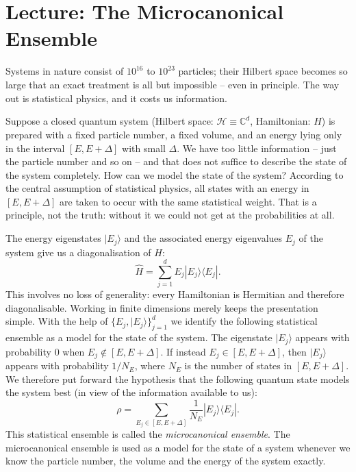 
\section{Lecture: The Microcanonical Ensemble}
Systems in nature consist of $10^{16}$ to $10^{23}$ particles; their Hilbert space becomes so large that an exact treatment is all but impossible -- even in principle. The way out is statistical physics, and it costs us information.

Suppose a closed quantum system (Hilbert space: $\mathcal{H}\equiv \mathbb{C}^d$, Hamiltonian: $\widehat{H}$) is prepared with a fixed particle number, a fixed volume, and an energy lying only in the interval $[E, E+\Delta]$ with small $\Delta$. We have too little information -- just the particle number and so on -- and that does not suffice to describe the state of the system completely. How can we model the state of the system? According to the central assumption of statistical physics, all states with an energy in $[E, E+\Delta]$ are taken to occur with the same statistical weight. That is a principle, not the truth: without it we could not get at the probabilities at all.

The energy eigenstates $|E_j\rangle$ and the associated energy eigenvalues $E_j$ of the system give us a diagonalisation of $H$:
\begin{equation}
  \widehat{H} = \sum_{j=1}^d E_j |E_j\rangle \langle E_j|.
\end{equation}
This involves no loss of generality: every Hamiltonian is Hermitian and therefore diagonalisable. Working in finite dimensions merely keeps the presentation simple.
With the help of $\{E_j, |E_j\rangle \}_{j=1}^d$ we identify the following statistical ensemble as a model for the state of the system. The eigenstate $|E_j\rangle$ appears with probability $0$ when $E_j\not\in [E,E+\Delta]$. If instead $E_j\in [E,E+\Delta]$, then $|E_j\rangle$ appears with probability $1/N_E$, where $N_E$ is the number of states in $[E, E+\Delta]$. We therefore put forward the hypothesis that the following quantum state models the system best (in view of the information available to us):
\begin{equation}
  \rho = \sum_{E_j\in [E,E+\Delta]} \frac{1}{N_E} |E_j\rangle \langle E_j|.
\end{equation} 
This statistical ensemble is called the \emph{microcanonical ensemble}. The microcanonical ensemble is used as a model for the state of a system whenever we know the particle number, the volume and the energy of the system exactly.

